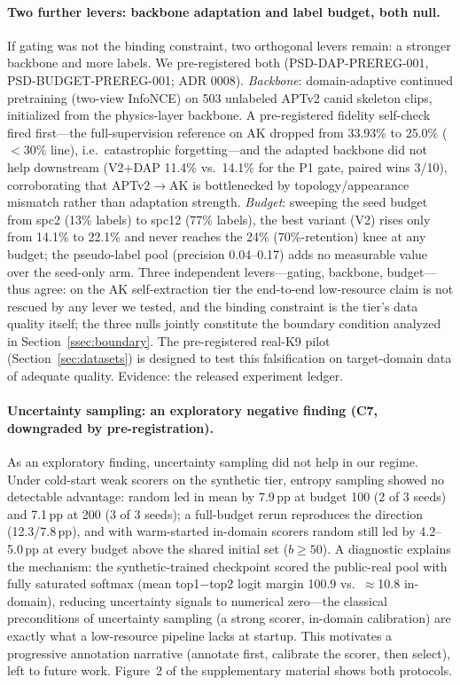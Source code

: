 \paragraph{Two further levers: backbone adaptation and label budget, both null.}
If gating was not the binding constraint, two orthogonal levers remain: a stronger backbone and more labels. We pre-registered both (PSD-DAP-PREREG-001, PSD-BUDGET-PREREG-001; ADR 0008). \emph{Backbone}: domain-adaptive continued pretraining (two-view InfoNCE) on 503 unlabeled APTv2 canid skeleton clips, initialized from the physics-layer backbone. A pre-registered fidelity self-check fired first---the full-supervision reference on AK dropped from 33.93\% to 25.0\% ($<$30\% line), i.e.\ catastrophic forgetting---and the adapted backbone did not help downstream (V2+DAP 11.4\% vs.\ 14.1\% for the P1 gate, paired wins 3/10), corroborating that APTv2$\to$AK is bottlenecked by topology/appearance mismatch rather than adaptation strength. \emph{Budget}: sweeping the seed budget from spc2 (13\% labels) to spc12 (77\% labels), the best variant (V2) rises only from 14.1\% to 22.1\% and never reaches the 24\% (70\%-retention) knee at any budget; the pseudo-label pool (precision 0.04--0.17) adds no measurable value over the seed-only arm. Three independent levers---gating, backbone, budget---thus agree: on the AK self-extraction tier the end-to-end low-resource claim is not rescued by any lever we tested, and the binding constraint is the tier's data quality itself; the three nulls jointly constitute the boundary condition analyzed in Section~\ref{ssec:boundary}. The pre-registered real-K9 pilot (Section~\ref{sec:datasets}) is designed to test this falsification on target-domain data of adequate quality. Evidence: the released experiment ledger.

\paragraph{Uncertainty sampling: an exploratory negative finding (C7, downgraded by pre-registration).}
As an exploratory finding, uncertainty sampling did not help in our regime. Under cold-start weak scorers on the synthetic tier, entropy sampling showed no detectable advantage: random led in mean by 7.9\,pp at budget 100 (2 of 3 seeds) and 7.1\,pp at 200 (3 of 3 seeds); a full-budget rerun reproduces the direction (12.3/7.8\,pp), and with warm-started in-domain scorers random still led by 4.2--5.0\,pp at every budget above the shared initial set ($b\geq 50$). A diagnostic explains the mechanism: the synthetic-trained checkpoint scored the public-real pool with fully saturated softmax (mean top1$-$top2 logit margin 100.9 vs.\ $\approx$10.8 in-domain), reducing uncertainty signals to numerical zero---the classical preconditions of uncertainty sampling (a strong scorer, in-domain calibration) are exactly what a low-resource pipeline lacks at startup. This motivates a progressive annotation narrative (annotate first, calibrate the scorer, then select), left to future work. Figure~2 of the supplementary material shows both protocols.

